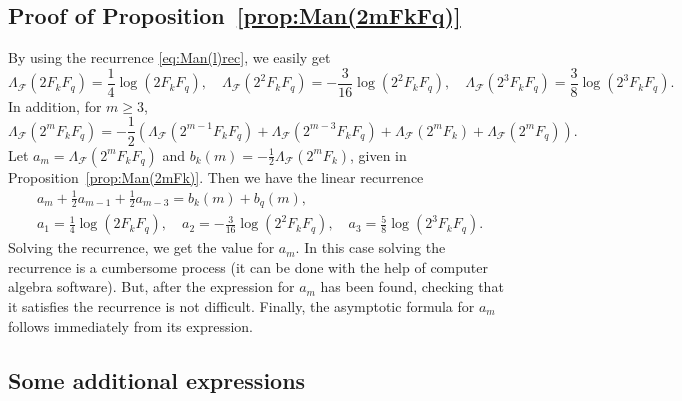 \documentclass[11pt, a4paper]{article}
\newcommand{\manF}{\Lambda_{\mathcal{F}}}
\theoremstyle{plain}
\theoremstyle{definition}
\begin{document}
\subsection{Proof of Proposition~\ref{prop:Man(2mFkFq)}}

By using the recurrence \eqref{eq:Man(l)rec}, we easily get
\[
\manF(2F_kF_q) = \frac{1}{4} \log(2F_kF_q),
\quad
\manF(2^2F_kF_q) = -\frac{3}{16} \log(2^2F_kF_q),
\quad
\manF(2^3F_kF_q) = \frac{3}{8} \log(2^3F_kF_q).
\]
In addition, for $m \ge 3$,
\[
\manF(2^mF_kF_q) = -\frac{1}{2} \left( \manF(2^{m-1}F_kF_q)
+ \manF(2^{m-3}F_kF_q) + \manF(2^{m}F_k) + \manF(2^{m}F_q) \right).
\]
Let $a_m = \manF(2^mF_kF_q)$ and $b_k(m) = -\frac{1}{2}\manF(2^{m}F_k)$, given in Proposition~\ref{prop:Man(2mFk)}. Then we have the linear recurrence
\begin{equation*}
\begin{gathered}
a_m + \frac{1}{2} a_{m-1} + \frac{1}{2} a_{m-3} = b_k(m) + b_q(m),
\\
a_1 = \frac{1}{4} \log(2F_kF_q),
\quad
a_2 = -\frac{3}{16} \log(2^2F_kF_q),
\quad
a_3 = \frac{5}{8} \log(2^3F_kF_q).
\end{gathered}
\end{equation*}
Solving the recurrence, we get the value for $a_m$. In this case solving the recurrence is a cumbersome process (it can be done with the help of computer algebra software). But, after the expression for $a_m$ has been found, checking that it satisfies the recurrence is not difficult. Finally, the asymptotic formula for $a_m$ follows immediately from its expression.

\subsection{Some additional expressions}

\end{document}

